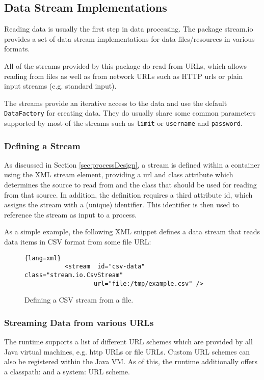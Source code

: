 \subsection{\label{app:dataStreams}\label{api:stream:io}Data Stream Implementations}

Reading data is usually the first step in data processing. The package
{\ttfamily stream.io} provides a set of data stream implementations
for data files/resources in various formats.

All of the streams provided by this package do read from URLs, which
allows reading from files as well as from network URLs such as HTTP
urls or plain input streams (e.g. standard input).

The streams provide an iterative access to the data and use the default
\texttt{DataFactory} for creating data. They do usually share some
common parameters supported by most of the streams such as
\texttt{limit} or \texttt{username} and \texttt{password}.

\subsubsection*{Defining a Stream}
As discussed in Section \ref{sec:processDesign}, a stream is
defined within a container using the XML {\ttfamily stream} element,
providing a {\ttfamily url} and {\ttfamily class} attribute which
determines the source to read from and the class that should be used
for reading from that source. In addition, the definition requires a
third attribute {\ttfamily id}, which assigns the stream with a
(unique) identifier. This identifier is then used to reference the
stream as input to a process.

As a simple example, the following XML snippet defines a data stream
that reads data items in CSV format from some file URL:
\begin{figure}[h!]
        \centering
        \begin{lstlisting}{lang=xml}
           <stream  id="csv-data" class="stream.io.CsvStream"
                   url="file:/tmp/example.csv" />
        \end{lstlisting}
        \caption{Defining a CSV stream from a file.}
\end{figure}

\subsubsection*{Streaming Data from various URLs}
The \streams runtime supports a list of different URL schemes which
are provided by all Java virtual machines, e.g. {\ttfamily http} URLs
or {\ttfamily file} URLs. Custom URL schemes can also be registered
within the Java VM. As of this, the \streams runtime additionally
offers a {\ttfamily classpath:} and a {\ttfamily system:} URL scheme.

